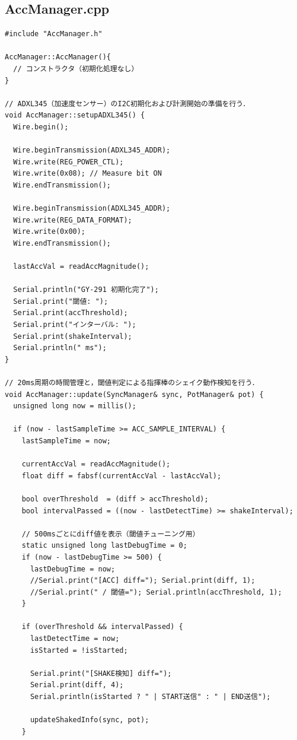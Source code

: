 \subsection{AccManager.cpp}
\begin{lstlisting}[caption={AccManager.cpp}, label={lst:siki_acc_cpp}]
#include "AccManager.h"

AccManager::AccManager(){
  // コンストラクタ（初期化処理なし）
}

// ADXL345（加速度センサー）のI2C初期化および計測開始の準備を行う．
void AccManager::setupADXL345() {
  Wire.begin();

  Wire.beginTransmission(ADXL345_ADDR);
  Wire.write(REG_POWER_CTL);
  Wire.write(0x08); // Measure bit ON
  Wire.endTransmission();

  Wire.beginTransmission(ADXL345_ADDR);
  Wire.write(REG_DATA_FORMAT);
  Wire.write(0x00);
  Wire.endTransmission();

  lastAccVal = readAccMagnitude();
  
  Serial.println("GY-291 初期化完了");
  Serial.print("閾値: "); 
  Serial.print(accThreshold);
  Serial.print("インターバル: "); 
  Serial.print(shakeInterval); 
  Serial.println(" ms");
}

// 20ms周期の時間管理と，閾値判定による指揮棒のシェイク動作検知を行う．
void AccManager::update(SyncManager& sync, PotManager& pot) {
  unsigned long now = millis();
  
  if (now - lastSampleTime >= ACC_SAMPLE_INTERVAL) {
    lastSampleTime = now;

    currentAccVal = readAccMagnitude();
    float diff = fabsf(currentAccVal - lastAccVal);

    bool overThreshold  = (diff > accThreshold);
    bool intervalPassed = ((now - lastDetectTime) >= shakeInterval);

    // 500msごとにdiff値を表示（閾値チューニング用）
    static unsigned long lastDebugTime = 0;
    if (now - lastDebugTime >= 500) {
      lastDebugTime = now;
      //Serial.print("[ACC] diff="); Serial.print(diff, 1);
      //Serial.print(" / 閾値="); Serial.println(accThreshold, 1);
    }

    if (overThreshold && intervalPassed) {
      lastDetectTime = now;
      isStarted = !isStarted;

      Serial.print("[SHAKE検知] diff=");
      Serial.print(diff, 4);
      Serial.println(isStarted ? " | START送信" : " | END送信");

      updateShakedInfo(sync, pot);
    }


\end{lstlisting}
